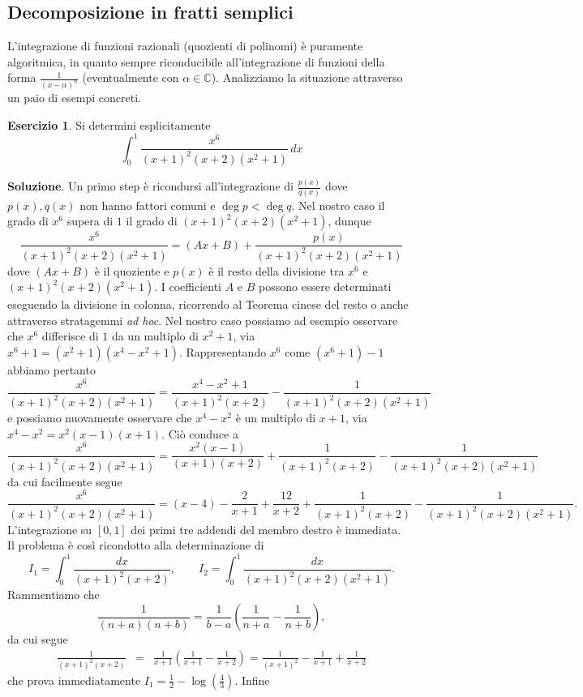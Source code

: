 \documentclass[a4paper,twoside]{article}
\newcommand{\C}{\mathbb{C}}
\theoremstyle{definition}
\newtheorem{ex}[theorem]{Esercizio}
\numberwithin{theorem}{section}
\begin{document}
\subsection{Decomposizione in fratti semplici}
L'integrazione di funzioni razionali (quozienti di polinomi) è puramente algoritmica, in quanto sempre riconducibile all'integrazione di funzioni della forma $\frac{1}{(x-\alpha)^n}$ (eventualmente con $\alpha\in\C$). Analizziamo la situazione attraverso un paio di esempi concreti.
\begin{ex} Si determini esplicitamente
$$ \int_{0}^{1}\frac{x^6}{(x+1)^2(x+2)(x^2+1)}\,dx $$ 
\end{ex}
\textbf{Soluzione}. Un primo step è ricondursi all'integrazione di $\frac{p(x)}{q(x)}$ dove $p(x),q(x)$ non hanno fattori comuni e $\deg p < \deg q$. Nel nostro caso il grado di $x^6$ supera di $1$ il grado di $(x+1)^2(x+2)(x^2+1)$, dunque 
$$ \frac{x^6}{(x+1)^2(x+2)(x^2+1)} = (Ax+B)+\frac{p(x)}{(x+1)^2(x+2)(x^2+1)}$$
dove $(Ax+B)$ è il quoziente e $p(x)$ è il resto della divisione tra $x^6$ e $(x+1)^2(x+2)(x^2+1)$. I coefficienti $A$ e $B$ possono essere determinati eseguendo la divisione in colonna, ricorrendo al Teorema cinese del resto o anche attraverso stratagemmi \emph{ad hoc}. Nel nostro caso possiamo ad esempio osservare che $x^6$ differisce di $1$ da un multiplo di $x^2+1$, via $x^6+1=(x^2+1)(x^4-x^2+1)$. Rappresentando $x^6$ come $(x^6+1)-1$ abbiamo pertanto 
$$ \frac{x^6}{(x+1)^2(x+2)(x^2+1)} = \frac{x^4-x^2+1}{(x+1)^2(x+2)}-\frac{1}{(x+1)^2(x+2)(x^2+1)}$$
e possiamo nuovamente osservare che $x^4-x^2$ è un multiplo di $x+1$, via $x^4-x^2=x^2(x-1)(x+1)$. Ciò conduce a 
$$ \frac{x^6}{(x+1)^2(x+2)(x^2+1)} = \frac{x^2(x-1)}{(x+1)(x+2)}+\frac{1}{(x+1)^2(x+2)}-\frac{1}{(x+1)^2(x+2)(x^2+1)}$$
da cui facilmente segue 
$$ \frac{x^6}{(x+1)^2(x+2)(x^2+1)} = (x-4)-\frac{2}{x+1}+\frac{12}{x+2}+\frac{1}{(x+1)^2(x+2)}-\frac{1}{(x+1)^2(x+2)(x^2+1)}.$$
L'integrazione su $[0,1]$ dei primi tre addendi del membro destro è immediata.\\ Il problema è così ricondotto alla determinazione di 
$$I_1=\int_{0}^{1}\frac{dx}{(x+1)^2(x+2)},\qquad I_2=\int_{0}^{1}\frac{dx}{(x+1)^2(x+2)(x^2+1)}.$$
Rammentiamo che $$\frac{1}{(n+a)(n+b)}=\frac{1}{b-a}\left(\frac{1}{n+a}-\frac{1}{n+b}\right),$$
da cui segue 
\begin{eqnarray*} \frac{1}{(x+1)^2(x+2)}&=&\frac{1}{x+1}\left(\frac{1}{x+1}-\frac{1}{x+2}\right)=\frac{1}{(x+1)^2}-\frac{1}{x+1}+\frac{1}{x+2}\end{eqnarray*}
che prova immediatamente $I_1=\frac{1}{2}-\log\left(\frac{4}{3}\right)$. Infine 
\end{document}
